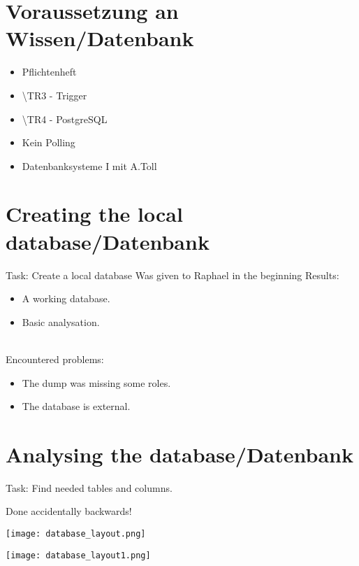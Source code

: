 \documentclass[ignorenonframetext, 11pt, table]{beamer}
\begin{document}
\section*{Voraussetzung an Wissen/Datenbank}
\begin{frame}
\begin{itemize}
\item Pflichtenheft \pause
\item \textbackslash TR3 - Trigger \pause
\item \textbackslash TR4 - PostgreSQL \pause
\item Kein Polling
\item Datenbanksysteme I mit A.Toll
\end{itemize}
\end{frame}

\section*{Creating the local database/Datenbank}
\begin{frame}
Task: Create a local database\pause
\newline\newline
Was given to Raphael in the beginning\newline\newline\pause
Results:\pause
\begin{itemize}
\item A working database.\pause
\item Basic analysation.\pause
\end{itemize}
~\\
Encountered problems:\pause
\begin{itemize}
\item The dump was missing some roles. \pause
\item The database is external.
\end{itemize}
\end{frame}

\section*{Analysing the database/Datenbank}
\begin{frame}
Task: Find needed tables and columns.\newline\pause

Done accidentally backwards!
\end{frame}

\begin{frame}
\texttt{[image: database\_layout.png]}
\end{frame}
\begin{frame}
\texttt{[image: database\_layout1.png]}
\end{frame}
\end{document}
